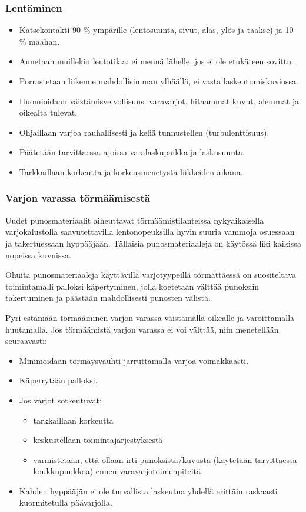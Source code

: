 \subsubsection{ Lentäminen}
\label{kuvunkasittely-oppilaana-lentaminen}

\begin{itemize}
\item  Katsekontakti 90 \% ympärille (lentosuunta, sivut, alas, ylös ja taakse) ja 10 \% maahan.  
\item  Annetaan muillekin lentotilaa: ei mennä lähelle, jos ei ole etukäteen sovittu. 
\item  Porrastetaan liikenne mahdollisimman ylhäällä, ei vasta laskeutumiskuviossa. 
\item  Huomioidaan väistämisvelvollisuus: varavarjot, hitaammat kuvut, alemmat ja oikealta tulevat. 
\item  Ohjaillaan varjoa rauhallisesti ja keliä tunnustellen (turbulenttisuus). 
\item  Päätetään tarvittaessa ajoissa varalaskupaikka ja laskusuunta. 
\item  Tarkkaillaan korkeutta ja korkeusmenetystä liikkeiden aikana. 
\end{itemize}
\subsubsection{ Varjon varassa törmäämisestä }
\label{kuvunkasittely-oppilaana-varjon-varassa-tormaamisesta}


Uudet punosmateriaalit aiheuttavat törmäämistilanteissa nykyaikaisella varjokalustolla saavutettavilla lentonopeuksilla hyvin suuria vammoja osuessaan ja takertuessaan hyppääjään. Tällaisia punosmateriaaleja on käytössä liki kaikissa nopeissa kuvuissa. 


Ohuita punosmateriaaleja käyttävillä varjotyypeillä törmättäessä on suositeltava toimintamalli palloksi käpertyminen, jolla koetetaan välttää punoksiin takertuminen ja päästään mahdollisesti punosten välistä. 


Pyri estämään törmääminen varjon varassa väistämällä oikealle ja varoittamalla huutamalla. Jos törmäämistä varjon varassa ei voi välttää, niin menetellään seuraavasti: 

\begin{itemize}
\item  Minimoidaan törmäysvauhti jarruttamalla varjoa voimakkaasti. 
\item  Käperrytään palloksi. 
\item  Jos varjot sotkeutuvat: 
	\begin{itemize}
	\item  tarkkaillaan korkeutta 
	\item  keskustellaan toimintajärjestyksestä 
	\item  varmistetaan, että ollaan irti punoksista/kuvusta (käytetään tarvittaessa koukkupuukkoa) ennen varavarjotoimenpiteitä. 
	\end{itemize}
\item  Kahden hyppääjän ei ole turvallista laskeutua yhdellä erittäin raskaasti kuormitetulla päävarjolla. 
\end{itemize}
